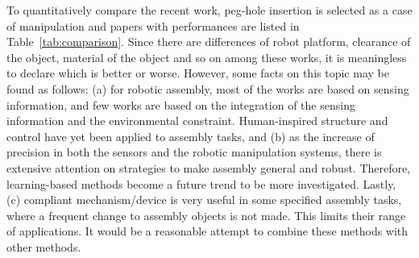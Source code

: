 \documentclass[journal,twoside,web]{ieeecolor}
\begin{document}
To quantitatively compare the recent work, peg-hole insertion is selected as a case of manipulation and papers with performances are listed in Table~\ref{tab:comparison}.  
Since there are differences of robot platform, clearance of the object, material of the object and so on among these works, it is meaningless to declare which is better or worse. 
However, some facts on this topic may be found as follows:
(a) for robotic assembly, most of the works are based on sensing information, and few works are based on the integration of the sensing information and the environmental constraint. Human-inspired structure and control have yet been applied to assembly tasks, and
(b) as the increase of precision in both the sensors and the robotic manipulation systems, there is extensive attention on strategies to make assembly general and robust. Therefore, learning-based methods become a future trend to be more investigated. Lastly, 
(c) compliant mechanism/device is very useful in some specified assembly tasks, where a frequent change to assembly objects is not made. This limits their range of applications. It would be a reasonable attempt to combine these methods with other methods.
\end{document}
